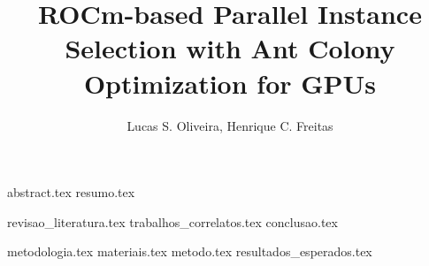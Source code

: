 \documentclass{article}
\title{ROCm-based Parallel Instance Selection with Ant Colony Optimization for GPUs}
\author{{Lucas S. Oliveira\inst{1}, Henrique C. Freitas\inst{1}}}
\begin{document}
\maketitle

{abstract.tex}
{resumo.tex}

{revisao_literatura.tex}
{trabalhos_correlatos.tex}
{conclusao.tex}

{metodologia.tex}
{materiais.tex}
{metodo.tex}
{resultados_esperados.tex}

\printbibliography
\end{document}
